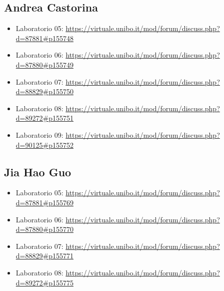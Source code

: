 \subsection{Andrea Castorina}

\begin{itemize}
 \item Laboratorio 05: \url{https://virtuale.unibo.it/mod/forum/discuss.php?d=87881#p155748}
 \item Laboratorio 06: \url{https://virtuale.unibo.it/mod/forum/discuss.php?d=87880#p155749}
 \item Laboratorio 07: \url{https://virtuale.unibo.it/mod/forum/discuss.php?d=88829#p155750}
 \item Laboratorio 08: \url{https://virtuale.unibo.it/mod/forum/discuss.php?d=89272#p155751}
 \item Laboratorio 09: \url{https://virtuale.unibo.it/mod/forum/discuss.php?d=90125#p155752}
\end{itemize}

\subsection{Jia Hao Guo}

\begin{itemize}
 \item Laboratorio 05: \url{https://virtuale.unibo.it/mod/forum/discuss.php?d=87881#p155769}
 \item Laboratorio 06: \url{https://virtuale.unibo.it/mod/forum/discuss.php?d=87880#p155770}
 \item Laboratorio 07: \url{https://virtuale.unibo.it/mod/forum/discuss.php?d=88829#p155771}
 \item Laboratorio 08: \url{https://virtuale.unibo.it/mod/forum/discuss.php?d=89272#p155775}
\end{itemize}